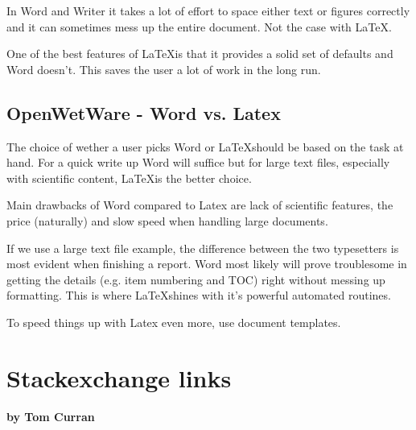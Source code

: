 In Word and Writer it takes a lot of effort to space either text or figures correctly and it can sometimes mess up the entire document. Not the case with \LaTeX.

One of the best features of \LaTeX is that it provides a solid set of defaults and Word doesn't. This saves the user a lot of work in the long run.

\subsection{OpenWetWare - Word vs. Latex}
The choice of wether a user picks Word or \LaTeX should be based on the task at hand. For a quick write up Word will suffice but for large text files, especially with scientific content, \LaTeX is the better choice.

Main drawbacks of Word compared to Latex are lack of scientific features, the price (naturally) and slow speed when handling large documents.

If we use a large text file example, the difference between the two typesetters is most evident when finishing a report. Word most likely will prove troublesome in getting the details (e.g. item numbering and TOC) right without messing up formatting. This is where \LaTeX shines with it's powerful automated routines.

To speed things up with Latex even more, use document templates.

\section{Stackexchange links}
\textbf{by Tom Curran}\\

